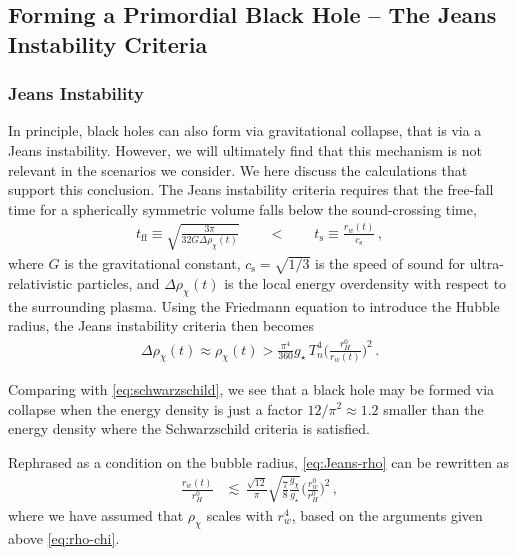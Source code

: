 \documentclass[
onecolumn, %
11pt, %
tightenlines,
superscriptaddress, %
nofootinbib, %
preprintnumbers, %
prd %
]{revtex4-1}
\begin{document}
\subsection{Forming a Primordial Black Hole -- The Jeans Instability Criteria}
\label{sec:JI-criteria}

\subsubsection{Jeans Instability}
\label{sec:jeans-instability}

In principle, black holes can also form via gravitational collapse, that is via a Jeans instability. However, we will ultimately find that this mechanism is not relevant in the scenarios we consider.  We here discuss the calculations that support this conclusion. The Jeans instability criteria requires that the free-fall time for a spherically symmetric volume falls below the sound-crossing time,
%
\begin{align}
  t_\text{ff} \equiv \sqrt{\frac{3\pi}{32 G \Delta\rho_\chi(t)}}
  \qquad < \qquad
  t_\text{s} \equiv \frac{r_w(t)}{c_\text{s}} \,,
\end{align}
%
where $G$ is the gravitational constant, $c_\text{s}=\sqrt{1/3}$ is the speed of sound for ultra-relativistic particles, and $\Delta\rho_\chi(t)$ is the local energy overdensity with respect to the surrounding plasma.  Using the Friedmann equation to introduce the Hubble radius, the Jeans instability criteria then becomes
%
\begin{align}
    \Delta\rho_\chi(t) \approx \rho_\chi(t) > \frac{\pi^4}{360}g_\star\,T_n^4 \bigg(\frac{r_H^0}{r_w(t)}\bigg)^{\!2} \,. 
    \label{eq:Jeans-rho}
\end{align}
%

Comparing with \cref{eq:schwarzschild}, we see that a black hole may be formed via collapse when the energy density is just a factor $12/\pi^2 \approx 1.2$ smaller than the energy density where the Schwarzschild criteria is satisfied.  

Rephrased as a condition on the bubble radius, \cref{eq:Jeans-rho} can be rewritten as
%
\begin{align}
    \frac{r_w(t)}{r_H^0} &\lesssim\, 
            \frac{\sqrt{12}}{\pi} 
            \sqrt{\frac{7}{8} \frac{g_\chi}{g_\star}}
            \bigg(\frac{r_w^0}{r_H^0}\bigg)^{\!2} \,,
\end{align}
%
where we have assumed that $\rho_\chi$ scales with $r_w^4$, based on the arguments given above \cref{eq:rho-chi}.
\end{document}
